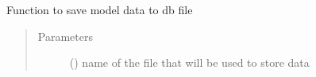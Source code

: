 \documentclass[letterpaper,10pt,english]{sphinxmanual}
\begin{document}
\begin{fulllineitems}
\begin{fulllineitems}
\label{\detokenize{pyCofea/api:cofea.Mesh.saveToDbFile}}
Function to save model data to db file
\begin{quote}\begin{description}
\item[{Parameters}] \leavevmode
{} () \textendash{} name of the file that will be used to store data

\end{description}\end{quote}

\end{fulllineitems}


\end{fulllineitems}

\end{document}
